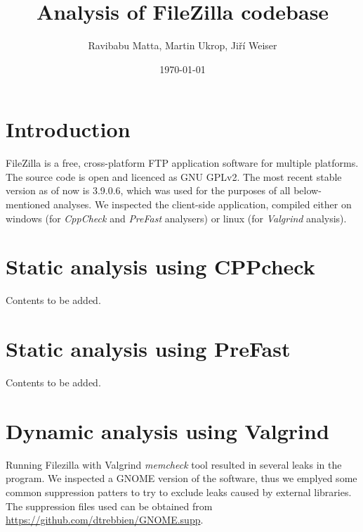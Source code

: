 \documentclass[11pt]{article}
\begin{document}
\title{Analysis of FileZilla codebase}
\date{\today}
\author{Ravibabu Matta, Martin Ukrop, Jiří Weiser}
\maketitle

\section{Introduction}

FileZilla is a free, cross-platform FTP application software for multiple platforms. The source code is open and licenced as GNU GPLv2. The most recent stable version as of now is 3.9.0.6, which was used for the purposes of all below-mentioned analyses. We inspected the client-side application, compiled either on windows (for \textit{CppCheck} and \textit{PreFast} analysers) or linux (for \textit{Valgrind} analysis).

\section{Static analysis using CPPcheck}

Contents to be added.

\section{Static analysis using PreFast}

Contents to be added.

\section{Dynamic analysis using Valgrind}

Running Filezilla with Valgrind \textit{memcheck} tool resulted in several leaks in the program. We inspected a GNOME version of the software, thus we emplyed some common suppression patters to try to exclude leaks caused by external libraries. The suppression files used can be obtained from \url{https://github.com/dtrebbien/GNOME.supp}.
\end{document}
